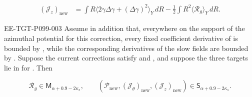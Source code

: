 \begin{lemma}
\begin{equation}
\begin{aligned}
(\mathcal J_z)_{\mathrm{new}}&=
 \int R\langle2\gamma\Delta\gamma+(\Delta\gamma)^2\rangle_Y\,dR
 -\frac12\int R^2\langle\mathcal R_g\rangle_Y\,dR.
\end{aligned}
\tag{8.27}\label{eq:8.27}
\end{equation}
\begin{EESegment}{EE-TGT-P099-003}
Assume in addition that, everywhere on the support of the azimuthal potential for this correction,
every fixed coefficient derivative of  is bounded by
, while the corresponding derivatives of the slow
fields  are bounded by
. Suppose the current corrections satisfy
 and
, and suppose the three targets lie in
 for . Then
\end{EESegment}
\[
\mathcal R_g\in \mathsf M_{\alpha+0.9-2\kappa_s},\qquad
(\mathcal P_{\mathrm{new}},(\mathcal J_\theta)_{\mathrm{new}},
 (\mathcal J_z)_{\mathrm{new}})\in \mathsf S_{\alpha+0.9-2\kappa_s}.
\]
\end{lemma}

